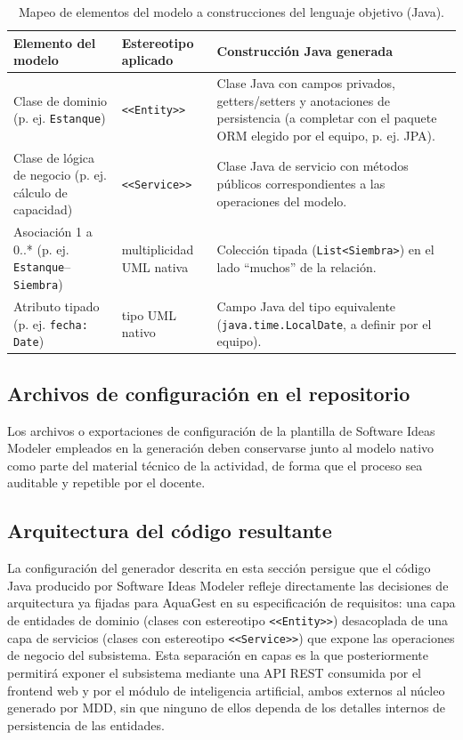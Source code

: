 \documentclass[11pt,a4paper]{article}
\begin{document}
\begin{table}[H]
\centering
\caption{Mapeo de elementos del modelo a construcciones del lenguaje objetivo (Java).}
\label{tab:mapeo-estereotipos}
\begin{tabular}{p{3.2cm}p{3.2cm}p{6.5cm}}
\toprule
\textbf{Elemento del modelo} & \textbf{Estereotipo aplicado} & \textbf{Construcción Java generada} \\
\midrule
Clase de dominio (p. ej. \texttt{Estanque}) & \texttt{<<Entity>>} & Clase Java con campos privados, getters/setters y anotaciones de persistencia (a completar con el paquete ORM elegido por el equipo, p. ej. JPA). \\
Clase de lógica de negocio (p. ej. cálculo de capacidad) & \texttt{<<Service>>} & Clase Java de servicio con métodos públicos correspondientes a las operaciones del modelo. \\
Asociación 1 a 0..* (p. ej. \texttt{Estanque}--\texttt{Siembra}) & multiplicidad UML nativa & Colección tipada (\texttt{List<Siembra>}) en el lado ``muchos'' de la relación. \\
Atributo tipado (p. ej. \texttt{fecha: Date}) & tipo UML nativo & Campo Java del tipo equivalente (\texttt{java.time.LocalDate}, a definir por el equipo). \\
\bottomrule
\end{tabular}
\end{table}

\subsection{Archivos de configuración en el repositorio}

Los archivos o exportaciones de configuración de la plantilla de Software Ideas Modeler empleados en la generación deben conservarse junto al modelo nativo como parte del material técnico de la actividad, de forma que el proceso sea auditable y repetible por el docente.

\subsection{Arquitectura del código resultante}

La configuración del generador descrita en esta sección persigue que el código Java producido por Software Ideas Modeler refleje directamente las decisiones de arquitectura ya fijadas para AquaGest en su especificación de requisitos: una capa de entidades de dominio (clases con estereotipo \texttt{<<Entity>>}) desacoplada de una capa de servicios (clases con estereotipo \texttt{<<Service>>}) que expone las operaciones de negocio del subsistema. Esta separación en capas es la que posteriormente permitirá exponer el subsistema mediante una API REST consumida por el frontend web y por el módulo de inteligencia artificial, ambos externos al núcleo generado por MDD, sin que ninguno de ellos dependa de los detalles internos de persistencia de las entidades.
\end{document}
